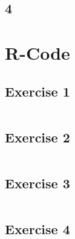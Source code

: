 \documentclass{article}
\begin{document}
    \subsection*{4}

    
  \section{R-Code}
    \subsection{Exercise 1}\label{sec:RE1}
      \begin{lstlisting}[language=R]
      \end{lstlisting}
    \subsection{Exercise 2}\label{sec:RE2}
      \begin{lstlisting}[language=R]
      \end{lstlisting}
    \subsection{Exercise 3}\label{sec:RE3}
      \begin{lstlisting}[language=R]
      \end{lstlisting}
    \subsection{Exercise 4}\label{sec:RE4}
      \begin{lstlisting}[language=R]
      \end{lstlisting}
\end{document}
